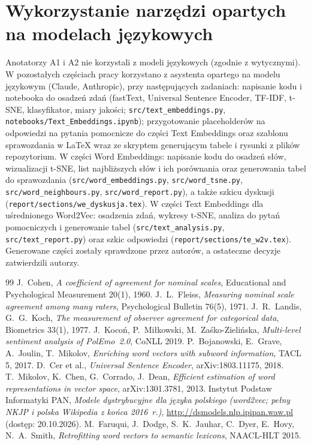 \documentclass[11pt,a4paper]{article}
\begin{document}
\section*{Wykorzystanie narzędzi opartych na modelach językowych}

Anotatorzy A1 i A2 nie korzystali z modeli językowych (zgodnie z wytycznymi).
W pozostałych częściach pracy korzystano z asystenta opartego na modelu językowym (Claude, Anthropic), przy następujących zadaniach:
napisanie kodu i notebooka do osadzeń zdań (fastText, Universal Sentence Encoder, TF-IDF, t-SNE, klasyfikator, miary jakości;
\texttt{src/text\_embeddings.py}, \texttt{notebooks/Text\_Embeddings.ipynb}); przygotowanie placeholderów na odpowiedzi
na pytania pomocnicze do części Text Embeddings oraz szablonu sprawozdania w \LaTeX{} wraz ze skryptem generującym
tabele i rysunki z plików repozytorium.
W części Word Embeddings: napisanie kodu do osadzeń słów, wizualizacji t-SNE, list najbliższych słów i ich porównania
oraz generowania tabel do sprawozdania (\texttt{src/word\_embeddings.py}, \texttt{src/word\_tsne.py},
\texttt{src/word\_neighbours.py}, \texttt{src/word\_report.py}), a także szkicu dyskusji
(\texttt{report/sections/we\_dyskusja.tex}).
W części Text Embeddings dla uśrednionego Word2Vec: osadzenia zdań, wykresy t-SNE, analiza do pytań pomocniczych
i generowanie tabel (\texttt{src/text\_analysis.py}, \texttt{src/text\_report.py}) oraz szkic odpowiedzi
(\texttt{report/sections/te\_w2v.tex}).
Generowane części zostały sprawdzone przez autorów, a ostateczne decyzje zatwierdzili autorzy.

\begin{thebibliography}{99}
 J.~Cohen, \emph{A coefficient of agreement for nominal scales}, Educational and Psychological Measurement 20(1), 1960.
 J.~L.~Fleiss, \emph{Measuring nominal scale agreement among many raters}, Psychological Bulletin 76(5), 1971.
 J.~R.~Landis, G.~G.~Koch, \emph{The measurement of observer agreement for categorical data}, Biometrics 33(1), 1977.
 J.~Kocoń, P.~Miłkowski, M.~Zaśko-Zielińska, \emph{Multi-level sentiment analysis of PolEmo~2.0}, CoNLL 2019.
 P.~Bojanowski, E.~Grave, A.~Joulin, T.~Mikolov, \emph{Enriching word vectors with subword information}, TACL 5, 2017.
 D.~Cer et al., \emph{Universal Sentence Encoder}, arXiv:1803.11175, 2018.
 T.~Mikolov, K.~Chen, G.~Corrado, J.~Dean, \emph{Efficient estimation of word representations in vector space}, arXiv:1301.3781, 2013.
 Instytut Podstaw Informatyki PAN, \emph{Modele dystrybucyjne dla języka polskiego (word2vec; pełny NKJP i polska Wikipedia z końca 2016~r.)}, \url{http://dsmodels.nlp.ipipan.waw.pl} (dostęp: 20.10.2026).
 M.~Faruqui, J.~Dodge, S.~K.~Jauhar, C.~Dyer, E.~Hovy, N.~A.~Smith, \emph{Retrofitting word vectors to semantic lexicons}, NAACL-HLT 2015.
\end{thebibliography}
\end{document}
